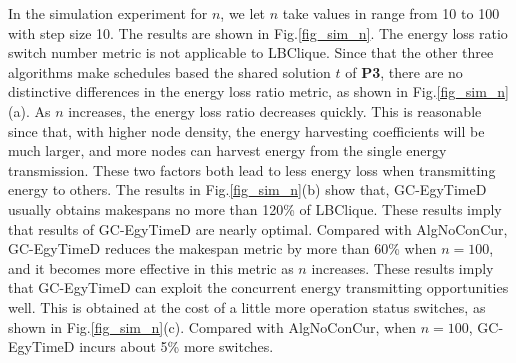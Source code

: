 \documentclass[journal,10pt]{IEEEtran}
\begin{document}
In the simulation experiment for $n$, we let $n$ take values in range from 10 to 100 with step size 10. The results are shown in Fig.\ref{fig_sim_n}. The energy loss ratio switch number metric is not applicable to LBClique. Since that the other three algorithms make schedules based the shared solution $t$ of \textbf{P3}, there are no distinctive differences in the energy loss ratio metric, as shown in Fig.\ref{fig_sim_n}(a). As $n$ increases, the energy loss ratio decreases quickly. This is reasonable since that, with higher node density, the energy harvesting coefficients will be much larger, and more nodes can harvest energy from the single energy transmission. These two factors both lead to less energy loss when transmitting energy to others. The results in Fig.\ref{fig_sim_n}(b) show that, GC-EgyTimeD usually obtains makespans no more than 120\% of LBClique. These results imply that results of GC-EgyTimeD are nearly optimal. Compared with AlgNoConCur, GC-EgyTimeD reduces the makespan metric by more than 60\% when $n{=}100$, and it becomes more effective in this metric as $n$ increases. These results imply that GC-EgyTimeD can exploit the concurrent energy transmitting opportunities well. This is obtained at the cost of a little more operation status switches, as shown in Fig.\ref{fig_sim_n}(c). Compared with AlgNoConCur, when $n{=}100$, GC-EgyTimeD incurs about 5\% more switches.
\end{document}
